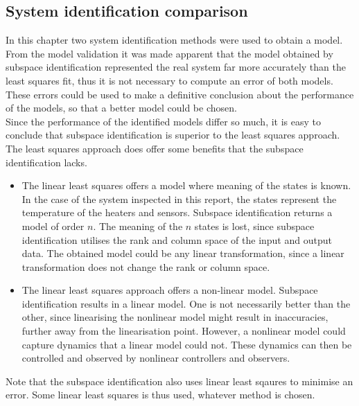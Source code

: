 \subsection{System identification comparison}
In this chapter two system identification methods were used to obtain a model. From the model validation it was made apparent that the model obtained by subspace identification represented the real system far more accurately than the least squares fit, thus it is not necessary to compute an error of both models. These errors could be used to make a definitive conclusion about the performance of the models, so that a better model could be chosen.\\
Since the performance of the identified models differ so much, it is easy to conclude that subspace identification is superior to the least squares approach. The least squares approach does offer some benefits that the subspace identification lacks.
\begin{itemize}
    \item The linear least squares offers a model where meaning of the states is known. In the case of the system inspected in this report, the states represent the temperature of the heaters and sensors. Subspace identification returns a model of order $n$. The meaning of the $n$ states is lost, since subspace identification utilises the rank and column space of the input and output data. The obtained model could be any linear transformation, since a linear transformation does not change the rank or column space.
    \item The linear least squares approach offers a non-linear model. Subspace identification results in a linear model. One is not necessarily better than the other, since linearising the nonlinear model might result in inaccuracies, further away from the linearisation point. However, a nonlinear model could capture dynamics that a linear model could not. These dynamics can then be controlled and observed by nonlinear controllers and observers.
\end{itemize}
Note that the subspace identification also uses linear least sqaures to minimise an error. Some linear least squares is thus used, whatever method is chosen.